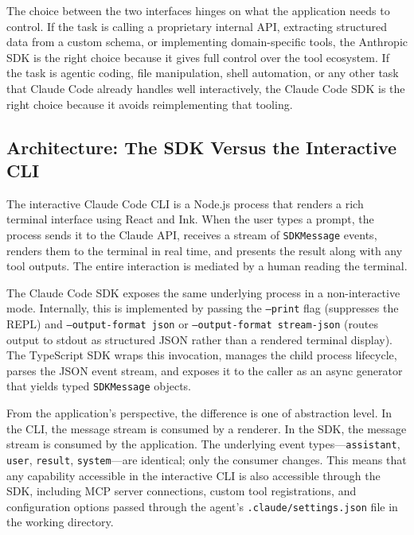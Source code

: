 The choice between the two interfaces hinges on what the application needs to control.
If the task is calling a proprietary internal API, extracting structured data from a
custom schema, or implementing domain-specific tools, the Anthropic SDK is the right
choice because it gives full control over the tool ecosystem. If the task is agentic
coding, file manipulation, shell automation, or any other task that Claude Code already
handles well interactively, the Claude Code SDK is the right choice because it avoids
reimplementing that tooling.

\subsection{Architecture: The SDK Versus the Interactive CLI}
\label{app:sdk-commercial:cc-sdk:arch}

\begin{deepdive}
The interactive Claude Code CLI is a Node.js process that renders a rich terminal
interface using React and Ink. When the user types a prompt, the process sends it to
the Claude API, receives a stream of \texttt{SDKMessage} events, renders them to the
terminal in real time, and presents the result along with any tool outputs. The entire
interaction is mediated by a human reading the terminal.

The Claude Code SDK exposes the same underlying process in a non-interactive mode.
Internally, this is implemented by passing the \texttt{--print} flag (suppresses
the REPL) and \texttt{--output-format json} or \texttt{--output-format stream-json}
(routes output to stdout as structured JSON rather than a rendered terminal display).
The TypeScript SDK wraps this invocation, manages the child process lifecycle,
parses the JSON event stream, and exposes it to the caller as an async generator
that yields typed \texttt{SDKMessage} objects.

From the application's perspective, the difference is one of abstraction level. In
the CLI, the message stream is consumed by a renderer. In the SDK, the message stream
is consumed by the application. The underlying event types---\texttt{assistant},
\texttt{user}, \texttt{result}, \texttt{system}---are identical; only the consumer
changes. This means that any capability accessible in the interactive CLI is also
accessible through the SDK, including MCP server connections, custom tool
registrations, and configuration options passed through the agent's
\texttt{.claude/settings.json} file in the working directory.
\end{deepdive}

